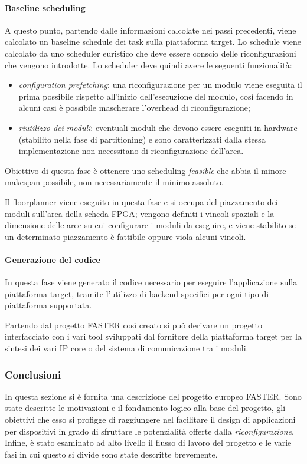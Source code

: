 \paragraph{Baseline scheduling}
A questo punto, partendo dalle informazioni calcolate nei passi precedenti, 
viene calcolato un baseline schedule dei task sulla piattaforma target. Lo 
schedule viene calcolato da uno scheduler euristico che deve essere conscio 
delle riconfigurazioni che vengono introdotte. Lo scheduler deve quindi 
avere le seguenti funzionalità:
\begin{itemize}
 \item \emph{configuration prefetching}: una riconfigurazione per un 
modulo viene eseguita il prima possibile rispetto all'inizio dell'esecuzione 
del modulo, così facendo in alcuni casi è possibile mascherare l'overhead di 
riconfigurazione;
 \item \emph{riutilizzo dei moduli}: eventuali moduli che devono 
essere eseguiti in hardware (stabilito nella fase di partitioning) e sono 
caratterizzati dalla stessa implementazione non necessitano di riconfigurazione 
dell'area.
\end{itemize}
Obiettivo di questa fase è ottenere uno scheduling \emph{feasible} che abbia il 
minore makespan possibile, non necessariamente il minimo assoluto.

Il floorplanner viene eseguito in questa fase e si occupa del piazzamento dei 
moduli sull'area della scheda \ac{FPGA}; vengono definiti i vincoli spaziali e 
la dimensione delle aree su cui configurare i moduli da eseguire, e viene 
stabilito se un determinato piazzamento è fattibile oppure viola alcuni vincoli.

\paragraph{Generazione del codice} %
In questa fase viene generato il codice necessario per eseguire l'applicazione 
sulla piattaforma target, tramite l'utilizzo di backend specifici per ogni tipo 
di piattaforma supportata.

Partendo dal progetto \ac{FASTER} così creato si può derivare un progetto 
interfacciato con i vari tool sviluppati dal fornitore della piattaforma target 
per la sintesi dei vari IP core o del sistema di comunicazione tra i moduli.


\subsubsection{Conclusioni}
In questa sezione si è fornita una descrizione del progetto europeo 
\ac{FASTER}. Sono state descritte le motivazioni e il fondamento logico alla 
base del progetto, gli obiettivi che esso si profigge di raggiungere nel 
facilitare il design di applicazioni per dispositivi in grado di sfruttare le 
potenzialità offerte dalla \emph{riconfigurazione}. Infine, è stato esaminato 
ad alto livello il flusso di lavoro del progetto e le varie fasi in cui questo 
si divide sono state descritte brevemente.

